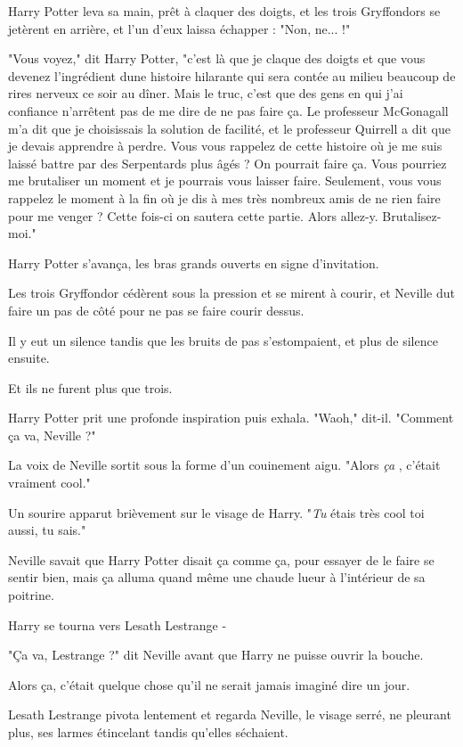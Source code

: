 Harry Potter leva sa main, prêt à claquer des doigts, et les trois Gryffondors se jetèrent en arrière, et l'un d'eux laissa échapper : "Non, ne... !"

"Vous voyez," dit Harry Potter, "c'est là que je claque des doigts et que vous devenez l'ingrédient dune histoire hilarante qui sera contée au milieu beaucoup de rires nerveux ce soir au dîner. Mais le truc, c'est que des gens en qui j'ai confiance n'arrêtent pas de me dire de ne pas faire ça. Le professeur McGonagall m'a dit que je choisissais la solution de facilité, et le professeur Quirrell a dit que je devais apprendre à perdre. Vous vous rappelez de cette histoire où je me suis laissé battre par des Serpentards plus âgés ? On pourrait faire ça. Vous pourriez me brutaliser un moment et je pourrais vous laisser faire. Seulement, vous vous rappelez le moment à la fin où je dis à mes très nombreux amis de ne rien faire pour me venger ? Cette fois-ci on sautera cette partie. Alors allez-y. Brutalisez-moi."

Harry Potter s'avança, les bras grands ouverts en signe d'invitation.

Les trois Gryffondor cédèrent sous la pression et se mirent à courir, et Neville dut faire un pas de côté pour ne pas se faire courir dessus.

Il y eut un silence tandis que les bruits de pas s'estompaient, et plus de silence ensuite.

Et ils ne furent plus que trois.

Harry Potter prit une profonde inspiration puis exhala. "Waoh," dit-il. "Comment ça va, Neville ?"

La voix de Neville sortit sous la forme d'un couinement aigu. "Alors \emph{ça} , c'était vraiment cool."

Un sourire apparut brièvement sur le visage de Harry. "\emph{Tu}  étais très cool toi aussi, tu sais."

Neville savait que Harry Potter disait ça comme ça, pour essayer de le faire se sentir bien, mais ça alluma quand même une chaude lueur à l'intérieur de sa poitrine.

Harry se tourna vers Lesath Lestrange -

"Ça va, Lestrange ?" dit Neville avant que Harry ne puisse ouvrir la bouche.

Alors ça, c'était quelque chose qu'il ne serait jamais imaginé dire un jour.

Lesath Lestrange pivota lentement et regarda Neville, le visage serré, ne pleurant plus, ses larmes étincelant tandis qu'elles séchaient.

